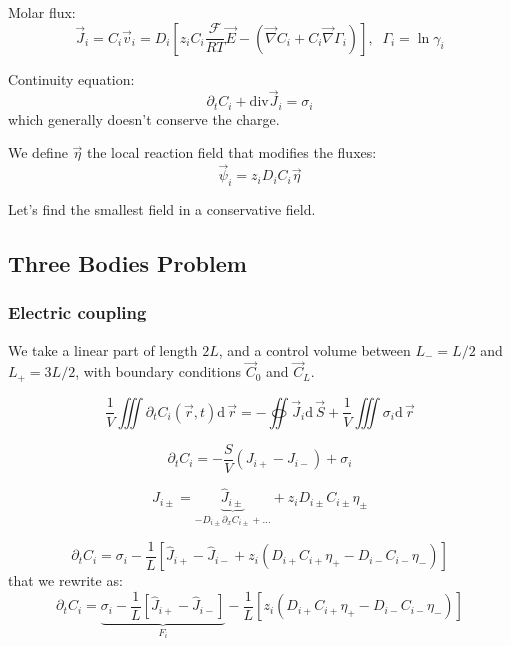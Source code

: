 \documentclass[aps,12pt]{revtex4}
\begin{document}
Molar flux:
\begin{equation}
	\vec{J}_i = C_i \vec{v}_i = D_i \left[z_i C_i  \dfrac{\mathcal{F}}{RT} \vec{E} - \left(\vec{\nabla} C_i + C_i \vec{\nabla}\Gamma_i\right) \right],\;\;\Gamma_i = \ln \gamma_i
\end{equation}

Continuity equation:
\begin{equation}
	\partial_t C_i + \mathrm{div} \vec{J}_i = \sigma_i
\end{equation}
which generally doesn't conserve the charge.

We define $\vec \eta$ the local reaction field that modifies the fluxes:
\begin{equation}
	\vec \psi_i = z_i D_i C_i \vec \eta
\end{equation}

Let's find the smallest field in a conservative field.

\subsection{Three Bodies Problem}

\subsubsection{Electric coupling}
We take a linear part of length $2L$, and a control volume between $L_-=L/2$ and $L_+=3L/2$,
with boundary conditions $\vec C_0$ and $\vec C_L$.

\begin{equation}
	\dfrac{1}{V} \iiint \partial_t C_i(\vec r,t)  \mathrm{d}\, \vec r
	= - \oiint  	\vec{J}_i \mathrm{d}\, \vec S + \dfrac{1}{V} \iiint \sigma_i \mathrm{d}\, \vec r
\end{equation}
 
\begin{equation}
	\partial_t C_i = -\dfrac{S}{V}(J_{i+}-J_{i-}) + \sigma_i
\end{equation}

\begin{equation}
	J_{i\pm} = \underbrace{\hat J_{i\pm}}_{-D_{i\pm} \partial_x C_{i\pm}+\ldots} + z_i D_{i\pm} C_{i\pm} \eta_\pm
\end{equation}

\begin{equation}
	\partial_t C_i = \sigma_i -\dfrac{1}{L} \left[ \hat J_{i+}- \hat J_{i-} + z_i (D_{i+} C_{i+} \eta_+ - D_{i-}C_{i-} \eta_-) \right] 
\end{equation}
that we rewrite as:
\begin{equation}
	\partial_t C_i =
	 \underbrace{\sigma_i -\dfrac{1}{L} \left[ \hat J_{i+}- \hat J_{i-} \right]}_{F_i} 
	 - \dfrac{1}{L}  \left[ z_i (D_{i+} C_{i+} \eta_+ - D_{i-}C_{i-} \eta_-)\right] 
\end{equation}
\end{document}
